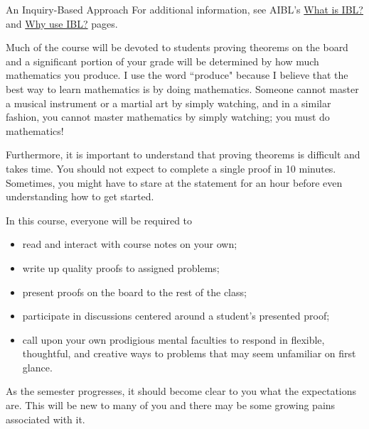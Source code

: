 \begin{section*}{An Inquiry-Based Approach}
\noindent For additional information, see AIBL's \href{http://www.inquirybasedlearning.org/?page=What_is_IBL}{What is IBL?} and \href{http://www.inquirybasedlearning.org/?page=Why_Use_IBL}{Why use IBL?} pages.

Much of the course will be devoted to students proving theorems on the board and a significant portion of your grade will be determined by how much mathematics you produce. I use the word ``produce" because I believe that the best way to learn mathematics is by doing mathematics. Someone cannot master a musical instrument or a martial art by simply watching, and in a similar fashion, you cannot master mathematics by simply watching; you must do mathematics!

Furthermore, it is important to understand that proving theorems is difficult and takes time. You should not expect to complete a single proof in 10 minutes. Sometimes, you might have to stare at the statement for an hour before even understanding how to get started. 

In this course, everyone will be required to

\begin{itemize}
\item read and interact with course notes on your own;
\item write up quality proofs to assigned problems;
\item present proofs on the board to the rest of the class;
\item participate in discussions centered around a student's presented proof;
\item call upon your own prodigious mental faculties to respond in flexible, thoughtful, and creative ways to problems that may seem unfamiliar on first glance.
\end{itemize}

\noindent As the semester progresses, it should become clear to you what the expectations are. This will be new to many of you and there may be some growing pains associated with it.

\end{section*}

